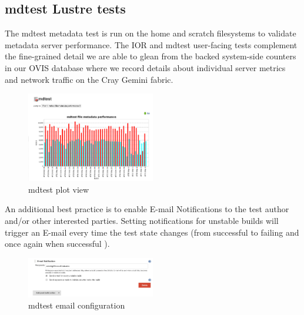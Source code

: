 \documentclass[10pt, conference, compsocconf]{IEEEtran}
\begin{document}
\subsection{mdtest Lustre tests}
The mdtest metadata test is run on the home and scratch filesystems to validate metadata server performance.  The IOR and mdtest user-facing tests complement the fine-grained detail we are able to glean from the backed system-side counters in our OVIS database where we record details about individual server metrics and network traffic on the Cray Gemini fabric.  
\begin{figure}[H]
\centering
\includegraphics[width=0.5\textwidth]{mdtest-plot}
\caption{ mdtest plot view }
\label{fig:mdtest-plot}
\end{figure}

An additional best practice is to enable E-mail Notifications to the test author and/or other interested parties.  Setting notifications for unstable builds will trigger an E-mail every time the test state changes (from successful to failing and once again when successful ).
\begin{figure}[H]
\centering
\includegraphics[width=0.5\textwidth]{mdtest-config-email}
\caption{ mdtest email configuration }
\label{fig:mdtest-config-email}
\end{figure}
\end{document}
